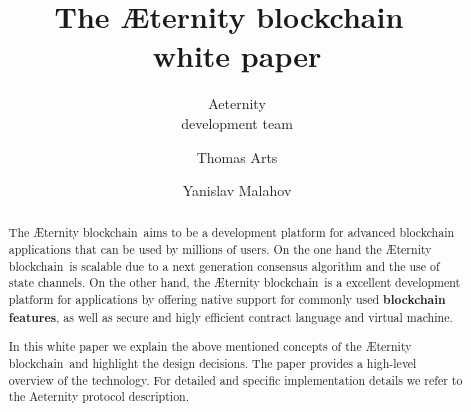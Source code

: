 \documentclass{article}
\newcommand{\blockchain}{{\AE}ternity blockchain}
\begin{document}
%
\title{The \blockchain\ \\white paper}

\author{Aeternity\\development team  \and Thomas Arts \and
             Yanislav Malahov}

\maketitle

%
\begin{abstract}
The \blockchain\ aims to be a development platform for advanced blockchain applications that can be used by millions of users.
On the one hand the \blockchain\ is scalable due to a next generation
consensus algorithm and the use of state channels. On the other hand,
the \blockchain\ is a excellent development platform for
applications by offering native support for commonly used
\textbf{blockchain features}, as well as secure and higly efficient
contract language and virtual machine.

In this white paper we explain the above mentioned concepts of the
\blockchain\ and highlight the design decisions. The
paper provides a high-level overview of the technology. For detailed
and specific implementation details we refer to the Aeternity protocol
description.

\end{abstract}










%

 
\end{document}
